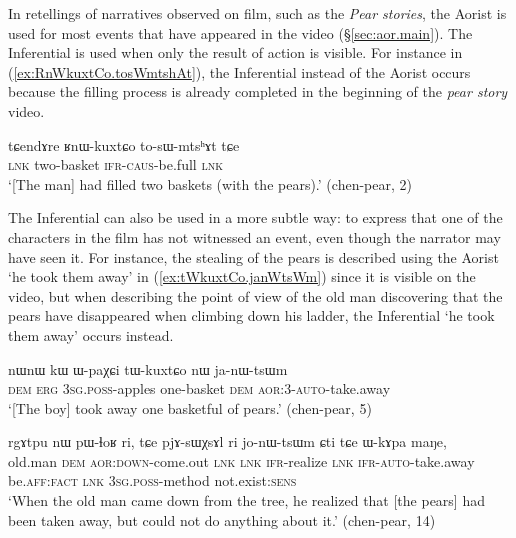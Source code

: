 In retellings of narratives observed on film, such as the \textit{Pear stories}, the Aorist is used for most events that have appeared in the video (§\ref{sec:aor.main}). The Inferential is used when only the result of action is visible. For instance in (\ref{ex:RnWkuxtCo.tosWmtshAt}), the Inferential  instead of the Aorist  occurs because the filling process is already completed in the beginning of the \textit{pear story} video.

\begin{exe}
\ex \label{ex:RnWkuxtCo.tosWmtshAt}
\gll tɕendɤre ʁnɯ-kuxtɕo to-sɯ-mtsʰɤt tɕe \\
\textsc{lnk} two-basket \textsc{ifr}-\textsc{caus}-be.full \textsc{lnk} \\
\glt `[The man] had filled two baskets (with the pears).' (chen-pear, 2)
 \end{exe}

The Inferential can also be used in a more subtle way: to express that one of the characters in the film has not witnessed an event, even though the narrator may have seen it. For instance, the stealing of the pears is described using the Aorist  `he took them away' in (\ref{ex:tWkuxtCo.janWtsWm}) since it is visible on the video, but when describing the point of view of the old man discovering that the pears have disappeared when climbing down his ladder, the Inferential  `he took them away' occurs instead.

\begin{exe}
\ex \label{ex:tWkuxtCo.janWtsWm}
\gll nɯnɯ kɯ ɯ-paχɕi tɯ-kuxtɕo nɯ ja-nɯ-tsɯm \\
\textsc{dem} \textsc{erg} \textsc{3sg}.\textsc{poss}-apples one-basket \textsc{dem} \textsc{aor}:3\flobv{}-\textsc{auto}-take.away \\
\glt `[The boy] took away one basketful of pears.' (chen-pear, 5)
 \end{exe}
 
\begin{exe}
\ex \label{ex:jonWtsWm.Cti}
\gll rgɤtpu nɯ pɯ-ɬoʁ ri, tɕe pjɤ-sɯχsɤl ri jo-nɯ-tsɯm ɕti tɕe ɯ-kɤpa maŋe,  \\
old.man \textsc{dem} \textsc{aor}:\textsc{down}-come.out \textsc{lnk} \textsc{lnk} \textsc{ifr}-realize \textsc{lnk} \textsc{ifr}-\textsc{auto}-take.away be.\textsc{aff}:\textsc{fact} \textsc{lnk} \textsc{3sg}.\textsc{poss}-method not.exist:\textsc{sens} \\
\glt `When the old man came down from the tree, he realized that [the pears] had been taken away, but could not do anything about it.' (chen-pear, 14)
 \end{exe}

